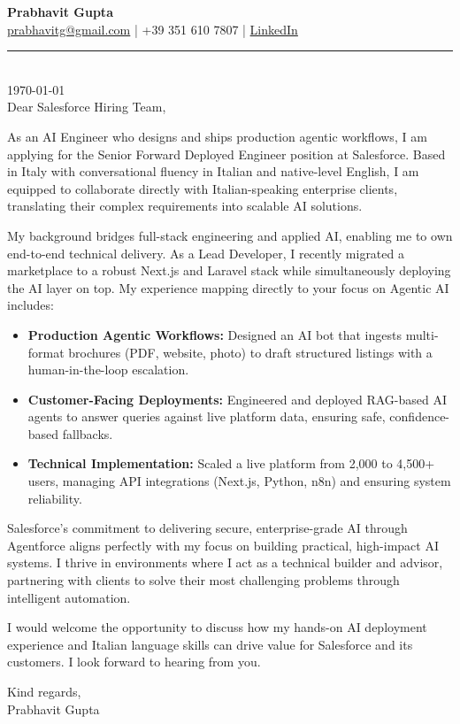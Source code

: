 \documentclass[11pt,a4paper]{article}
\begin{document}
{\Large \textbf{Prabhavit Gupta}} \\[1ex]
\href{mailto:prabhavitg@gmail.com}{prabhavitg@gmail.com} | +39 351 610 7807 | \href{https://www.linkedin.com/in/prabhavit/}{LinkedIn} \\[2ex]
\noindent\rule{\textwidth}{0.4pt} \\[2ex]


\today \\[2ex]

Dear Salesforce Hiring Team,


As an AI Engineer who designs and ships production agentic workflows, I am applying for the Senior Forward Deployed Engineer position at Salesforce. Based in Italy with conversational fluency in Italian and native-level English, I am equipped to collaborate directly with Italian-speaking enterprise clients, translating their complex requirements into scalable AI solutions.


My background bridges full-stack engineering and applied AI, enabling me to own end-to-end technical delivery. As a Lead Developer, I recently migrated a marketplace to a robust Next.js and Laravel stack while simultaneously deploying the AI layer on top. My experience mapping directly to your focus on Agentic AI includes:


\begin{itemize}
    \item \textbf{Production Agentic Workflows:} Designed an AI bot that ingests multi-format brochures (PDF, website, photo) to draft structured listings with a human-in-the-loop escalation.
    \item \textbf{Customer-Facing Deployments:} Engineered and deployed RAG-based AI agents to answer queries against live platform data, ensuring safe, confidence-based fallbacks.
    \item \textbf{Technical Implementation:} Scaled a live platform from 2,000 to 4,500+ users, managing API integrations (Next.js, Python, n8n) and ensuring system reliability.
\end{itemize}
\vspace{6pt}

Salesforce's commitment to delivering secure, enterprise-grade AI through Agentforce aligns perfectly with my focus on building practical, high-impact AI systems. I thrive in environments where I act as a technical builder and advisor, partnering with clients to solve their most challenging problems through intelligent automation.


I would welcome the opportunity to discuss how my hands-on AI deployment experience and Italian language skills can drive value for Salesforce and its customers. I look forward to hearing from you.


\begin{flushright}
Kind regards, \\[3ex]


Prabhavit Gupta

\end{flushright}
\end{document}
